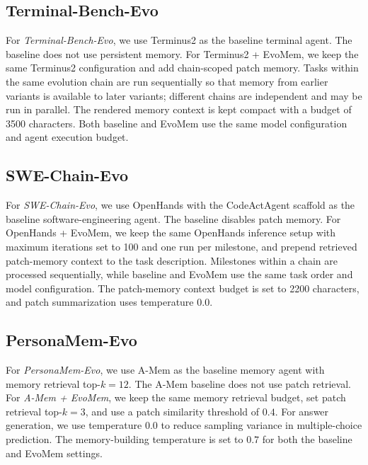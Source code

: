 \documentclass{llmxive}
\begin{document}
\subsection{Terminal-Bench-Evo}

For \emph{Terminal-Bench-Evo}, we use Terminus2 as the baseline terminal agent. The baseline does not use persistent memory. For Terminus2 + EvoMem, we keep the same Terminus2 configuration and add chain-scoped patch memory. Tasks within the same evolution chain are run sequentially so that memory from earlier variants is available to later variants; different chains are independent and may be run in parallel. The rendered memory context is kept compact with a budget of 3500 characters. Both baseline and EvoMem use the same model configuration and agent execution budget.



\subsection{SWE-Chain-Evo}
For \emph{SWE-Chain-Evo}, we use OpenHands with the CodeActAgent scaffold as the baseline software-engineering agent. The baseline disables patch memory. For OpenHands + EvoMem, we keep the same OpenHands inference setup with maximum iterations set to 100 and one run per milestone, and prepend retrieved patch-memory context to the task description. Milestones within a chain are processed sequentially, while baseline and EvoMem use the same task order and model configuration. The patch-memory context budget is set to 2200 characters, and patch summarization uses temperature $0.0$.



\subsection{PersonaMem-Evo}

\label{app:setting_persona_mem_evo}

For \emph{PersonaMem-Evo}, we use A-Mem \cite{xu2025amem} as the baseline memory agent with memory retrieval top-$k=12$. The A-Mem baseline does not use patch retrieval. For \emph{A-Mem + EvoMem}, we keep the same memory retrieval budget, set patch retrieval top-$k=3$, and use a patch similarity threshold of $0.4$. For answer generation, we use temperature $0.0$ to reduce sampling variance in multiple-choice prediction. The memory-building temperature is set to $0.7$ for both the baseline and EvoMem settings.
\end{document}
